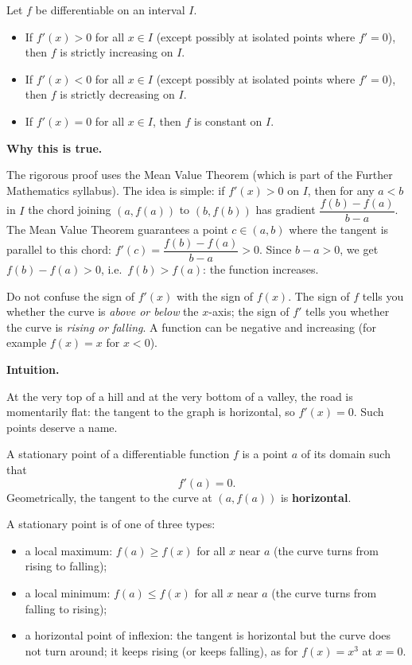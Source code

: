 \documentclass[11pt]{article}
\newcommand{\cle}[1]{{\popxbold\color{popdark}#1}}
\newcounter{popsec}
\newcounter{popsub}
\newcommand{\courssub}[1]{%
  \stepcounter{popsub}%
  \par\vspace{9pt}\noindent{\popxbold\fontsize{11.5}{13}\selectfont\color{popink}{\color{poporange}\thepopsec.\thepopsub}\hspace{6pt}#1}\par\nopagebreak\vspace{4pt}
}
\begin{document}
\begin{propriete}
Let $f$ be differentiable on an interval $I$.
\begin{itemize}
\item If $f'(x)>0$ for all $x\in I$ (except possibly at isolated points where $f'=0$), then $f$ is \cle{strictly increasing} on $I$.
\item If $f'(x)<0$ for all $x\in I$ (except possibly at isolated points where $f'=0$), then $f$ is \cle{strictly decreasing} on $I$.
\item If $f'(x)=0$ for all $x\in I$, then $f$ is \cle{constant} on $I$.
\end{itemize}
\end{propriete}

\textbf{Why this is true.}\par
The rigorous proof uses the Mean Value Theorem (which is part of the Further Mathematics syllabus). The idea is simple: if $f'(x)>0$ on $I$, then for any $a<b$ in $I$ the chord joining $(a,f(a))$ to $(b,f(b))$ has gradient $\dfrac{f(b)-f(a)}{b-a}$. The Mean Value Theorem guarantees a point $c\in(a,b)$ where the tangent is parallel to this chord: $f'(c)=\dfrac{f(b)-f(a)}{b-a}>0$. Since $b-a>0$, we get $f(b)-f(a)>0$, i.e.\ $f(b)>f(a)$: the function increases.

\begin{attention}
Do not confuse the sign of $f'(x)$ with the sign of $f(x)$. The sign of $f$ tells you whether the curve is \emph{above or below} the $x$-axis; the sign of $f'$ tells you whether the curve is \emph{rising or falling}. A function can be negative and increasing (for example $f(x)=x$ for $x<0$).
\end{attention}

\courssub{Stationary Points and Their Nature}

\textbf{Intuition.}\par
At the very top of a hill and at the very bottom of a valley, the road is momentarily flat: the tangent to the graph is horizontal, so $f'(x)=0$. Such points deserve a name.

\begin{definition}
A \cle{stationary point} of a differentiable function $f$ is a point $a$ of its domain such that
\[ f'(a)=0. \]
Geometrically, the tangent to the curve at $(a,f(a))$ is \textbf{horizontal}.
\end{definition}

A stationary point is of one of three types:
\begin{itemize}
\item a \cle{local maximum}: $f(a)\geq f(x)$ for all $x$ near $a$ (the curve turns from rising to falling);
\item a \cle{local minimum}: $f(a)\leq f(x)$ for all $x$ near $a$ (the curve turns from falling to rising);
\item a \cle{horizontal point of inflexion}: the tangent is horizontal but the curve does not turn around; it keeps rising (or keeps falling), as for $f(x)=x^3$ at $x=0$.
\end{itemize}
\end{document}
